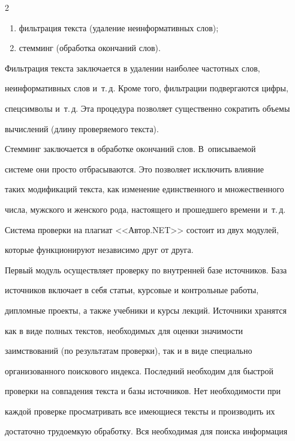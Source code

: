 \begin{multicols}{2}
\begin{enumerate}[(1)]
  \item фильтрация текста (удаление неинформативных слов);

  \item стемминг (обработка окончаний слов).

  \end{enumerate}

  

  Фильтрация текста заключается в удалении наиболее частотных слов, 

неинформативных слов и~т.\,д. Кроме того, фильтрации подвергаются цифры, 

спецсимволы и~т.\,д. Эта процедура позволяет существенно сократить объемы 

вычислений (длину проверяемого текста). 

  

  Стемминг заключается в обработке окончаний слов. В~описываемой 

  сис\-те\-ме они просто отбрасываются. Это позволяет исключить влияние 

таких модификаций текста, как изменение единственного и множественного 

числа, мужского и женского рода, настоящего и прошедшего времени и~т.\,д.

  

  Система проверки на плагиат <<Автор.NET>> состоит из двух модулей, 

которые функционируют независимо друг от друга.

  

  Первый модуль осуществляет проверку по внут\-рен\-ней базе источников. База 

источников включает в себя статьи, курсовые и контрольные работы, 

дипломные проекты, а также учебники и курсы лекций. Источники хранятся 

как в виде полных текстов, необходимых для оценки значимости 

заимствований (по результатам проверки), так и в виде специально 

организованного поискового индекса. Последний необходим для быстрой 

проверки на совпадения текста и базы источников. Нет необходимости при 

каждой проверке просматривать все имеющиеся тексты и производить их 

достаточно трудоемкую обработку. Вся необходимая для поиска информация 


\end{multicols}
